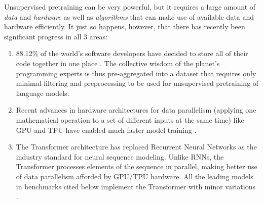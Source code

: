 Unsupervised pretraining can be very powerful, but it requires a large amount of \emph{data} and \emph{hardware} as well as \emph{algorithms} that can make use of available data and hardware efficiently. 
It just so happens, however, that there has recently been significant progress in all 3 areas:
\begin{enumerate}
    \item 88.12\% of the world's software developers have decided to store all of their code together in one place \cite{GithubMarketShare}. The collective wisdom of the planet's programming experts is thus pre-aggregated into a dataset that requires only minimal filtering and preprocessing \cite{kocetkovStack3TB2022} to be used for unsupervised pretraining of language models.
    \item Recent advances in hardware architectures for data parallelism (applying one mathematical operation to a set of different inputs at the same time) like GPU \cite{dallyEvolutionGraphicsProcessing2021} and TPU \cite{jouppiMotivationEvaluationFirst2018} have enabled much faster model training \cite{wangBenchmarkingTPUGPU2019}. 
    \item The Transformer architecture \cite{vaswaniAttentionAllYou2023} has replaced Recurrent Neural Networks \cite{hochreiterLongShorttermMemory1997,choPropertiesNeuralMachine2014} as the industry standard for neural sequence modeling. Unlike RNNs, the Transformer processes elements of the sequence in parallel, making better use of data parallelism afforded by GPU/TPU hardware. All the leading models in benchmarks cited below implement the Transformer with minor variations \cite{raffelExploringLimitsTransfer2023, wangGrokkedTransformersAre2024, geipingCrammingTrainingLanguage2022, liuBetterFewShotFinetuning2023, liuSwinTransformerV22022, rabeSelfattentionDoesNot2022, soPrimerSearchingEfficient2022, sunLengthExtrapolatableTransformer2022, xieResiDualTransformerDual2023, burtsevMemoryTransformer2021, dingCogViewMasteringTexttoImage2021, dingERNIEDocRetrospectiveLongDocument2021, henryQueryKeyNormalizationTransformers2020, heRealFormerTransformerLikes2021, huangAttentionAttentionImage2019, luUnderstandingImprovingTransformer2019, nguyenTransformersTearsImproving2019, parisottoStabilizingTransformersReinforcement2019, PathwaysLanguageModel, pressImprovingTransformerModels2020, pressTRAINSHORTTEST2022, shazeerFastTransformerDecoding2019, shazeerGLUVariantsImprove2020, shazeerTalkingHeadsAttention2020, shleiferNormFormerImprovedTransformer2021, sukhbaatarAugmentingSelfattentionPersistent2019, wangCrossFormerVersatileVision2021, zhangRootMeanSquare2019, zhaoExplicitSparseTransformer2019}.
\end{enumerate}

